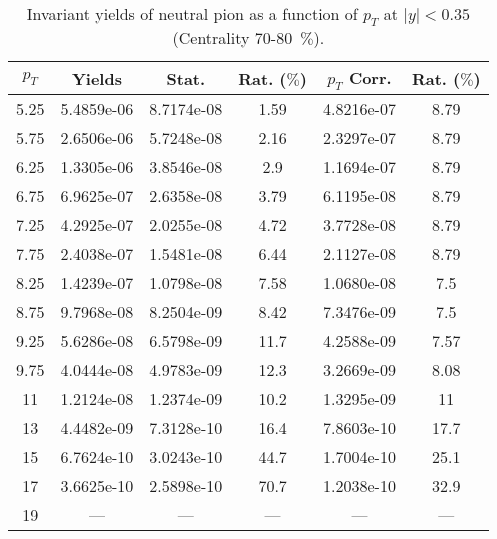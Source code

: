             
\begin{table}[!htb]
\centering
\begin{tabular}{|c|c|c|c|c|c|}
\hline
$p_{T}$ & Yields & Stat. & Rat. ($\%$) & $p_{T}$ Corr. & Rat. ($\%$) \\
\hline
5.25 & 5.4859e-06 & 8.7174e-08 & 1.59 & 4.8216e-07 & 8.79 \\ 
5.75 & 2.6506e-06 & 5.7248e-08 & 2.16 & 2.3297e-07 & 8.79 \\ 
6.25 & 1.3305e-06 & 3.8546e-08 & 2.9 & 1.1694e-07 & 8.79 \\ 
6.75 & 6.9625e-07 & 2.6358e-08 & 3.79 & 6.1195e-08 & 8.79 \\ 
7.25 & 4.2925e-07 & 2.0255e-08 & 4.72 & 3.7728e-08 & 8.79 \\ 
7.75 & 2.4038e-07 & 1.5481e-08 & 6.44 & 2.1127e-08 & 8.79 \\ 
8.25 & 1.4239e-07 & 1.0798e-08 & 7.58 & 1.0680e-08 & 7.5 \\ 
8.75 & 9.7968e-08 & 8.2504e-09 & 8.42 & 7.3476e-09 & 7.5 \\ 
9.25 & 5.6286e-08 & 6.5798e-09 & 11.7 & 4.2588e-09 & 7.57 \\ 
9.75 & 4.0444e-08 & 4.9783e-09 & 12.3 & 3.2669e-09 & 8.08 \\ 
11 & 1.2124e-08 & 1.2374e-09 & 10.2 & 1.3295e-09 & 11 \\ 
13 & 4.4482e-09 & 7.3128e-10 & 16.4 & 7.8603e-10 & 17.7 \\ 
15 & 6.7624e-10 & 3.0243e-10 & 44.7 & 1.7004e-10 & 25.1 \\ 
17 & 3.6625e-10 & 2.5898e-10 & 70.7 & 1.2038e-10 & 32.9 \\ 
19 & --- & --- & --- & --- & --- \\ 
\hline
\end{tabular}
\caption{Invariant yields of neutral pion as a function of $p_{T}$ at $|y|<0.35$ (Centrality 70-80~$\%$).}
\end{table}
            
